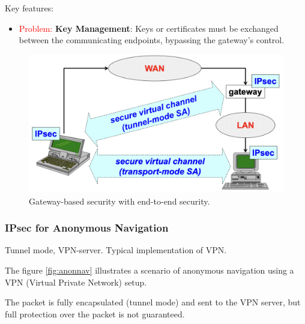 \begin{multicols}{2}
\raggedcolumns
    Key features:
    \begin{itemize}
        \item \textcolor{red}{Problem: }\textbf{Key Management}: Keys or certificates must be exchanged between the communicating endpoints, bypassing the gateway's control.
    \end{itemize}
\columnbreak

\begin{figure}[H]
    \centering
  \includegraphics[width=\linewidth]{Images/NetSec/gatsec_end.png}
  \caption{Gateway-based security with end-to-end security.}
  \label{fig:gat_end}
\end{figure}
\end{multicols}


\clearpage

\subsubsection{IPsec for Anonymous Navigation}
\begin{center}
    Tunnel mode, VPN-server. Typical implementation of VPN.
\end{center}
The figure \ref{fig:anonnav} illustrates a scenario of anonymous navigation using a VPN (Virtual Private Network) setup.

The packet is fully encapsulated (tunnel mode) and sent to the VPN server, but full protection over the packet is not guaranteed.



